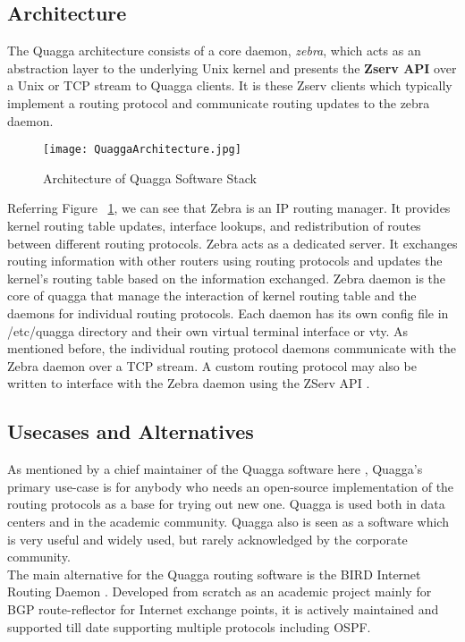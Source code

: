 \documentclass{article}
\begin{document}
\subsection{Architecture}
The Quagga architecture consists of a core daemon, \textit{zebra}, which acts as an abstraction 
layer to the underlying Unix kernel and presents the \textbf{Zserv API} over a Unix or TCP stream 
to Quagga clients. It is these Zserv clients which typically implement a routing protocol 
and communicate routing updates to the zebra daemon.\cite{quaggaofficial} \\
\begin{figure}[ht!]
  \centering
  \texttt{[image: QuaggaArchitecture.jpg]}
  \caption{Architecture of Quagga Software Stack}
  \label{fig:quaggaarchitecture}
\end{figure}
Referring Figure~ \ref{fig:quaggaarchitecture}, we can see that Zebra is an IP routing manager. 
It provides kernel routing table updates, interface lookups, and redistribution of routes between 
different routing protocols. Zebra acts as a dedicated server. It exchanges routing information with 
other routers using routing protocols and updates the kernel’s routing table based on the information exchanged.
Zebra daemon is the core of quagga that manage the interaction of kernel routing table and the daemons for 
individual routing protocols. Each daemon has its own config file in /etc/quagga directory and their own 
virtual terminal interface or vty. As mentioned before, the individual routing protocol daemons communicate 
with the Zebra daemon over a TCP stream. A custom routing protocol may also be written to interface with the
Zebra daemon using the ZServ API \cite{zservdocs}.

\subsection{Usecases and Alternatives}
As mentioned by a chief maintainer of the Quagga software here \cite{martininterview}, Quagga's
primary use-case is for anybody who needs an open-source implementation of the routing protocols
as a base for trying out new one. Quagga is used both in data centers and in the academic community. 
Quagga also is seen as a software which is very useful and widely used, but rarely acknowledged by the corporate community.\\
The main alternative for the Quagga routing software is the BIRD Internet Routing Daemon \cite{bird}.
Developed from scratch as an academic project mainly for BGP route-reflector for Internet exchange points, 
it is actively maintained and supported till date supporting multiple protocols including OSPF.
\end{document}
